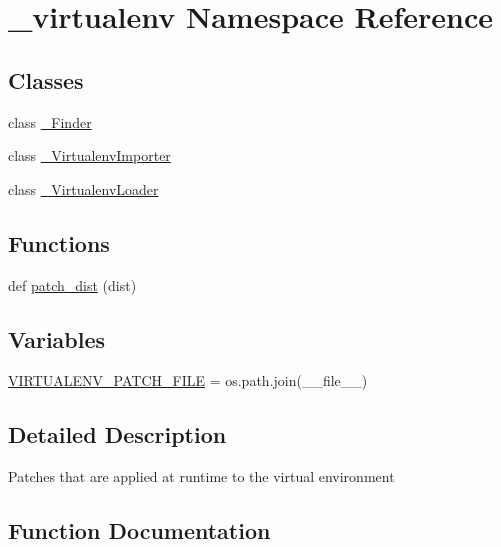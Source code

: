 \hypertarget{namespace__virtualenv}{}\section{\+\_\+virtualenv Namespace Reference}
\label{namespace__virtualenv}
\subsection*{Classes}
\begin{DoxyCompactItemize}
\item 
class \hyperlink{class__virtualenv_1_1__Finder}{\+\_\+\+Finder}
\item 
class \hyperlink{class__virtualenv_1_1__VirtualenvImporter}{\+\_\+\+Virtualenv\+Importer}
\item 
class \hyperlink{class__virtualenv_1_1__VirtualenvLoader}{\+\_\+\+Virtualenv\+Loader}
\end{DoxyCompactItemize}
\subsection*{Functions}
\begin{DoxyCompactItemize}
\item 
def \hyperlink{namespace__virtualenv_aca7a80d2c0638e3bfefa3fd885099ac7}{patch\+\_\+dist} (dist)
\end{DoxyCompactItemize}
\subsection*{Variables}
\begin{DoxyCompactItemize}
\item 
\hyperlink{namespace__virtualenv_aa31583cf1049cda450bcba7a29326484}{V\+I\+R\+T\+U\+A\+L\+E\+N\+V\+\_\+\+P\+A\+T\+C\+H\+\_\+\+F\+I\+LE} = os.\+path.\+join(\+\_\+\+\_\+file\+\_\+\+\_\+)
\end{DoxyCompactItemize}


\subsection{Detailed Description}
\begin{DoxyVerb}Patches that are applied at runtime to the virtual environment\end{DoxyVerb}
 

\subsection{Function Documentation}
\mbox{\label{namespace__virtualenv_aca7a80d2c0638e3bfefa3fd885099ac7}} 
